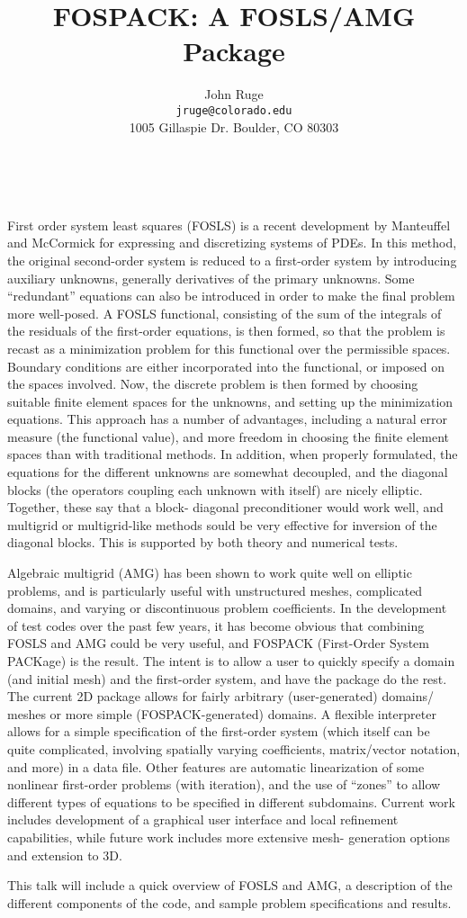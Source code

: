 \documentclass[11pt]{article}
\date{ ~ \hspace{-4mm}}
\title{FOSPACK: A FOSLS/AMG Package  }
\author{John Ruge \\ {\tt  jruge@colorado.edu} \\ 1005 Gillaspie Dr. Boulder, CO  80303}
\begin{document}
\maketitle
\thispagestyle{empty}





 



First order system least squares (FOSLS) is a recent development by Manteuffel 
and McCormick for expressing and discretizing systems of PDEs. In this method,
the original second-order system is reduced to a first-order system by 
introducing auxiliary unknowns, generally derivatives of the primary unknowns.
Some ``redundant'' equations can also be introduced in order to make the final
problem more well-posed. A FOSLS functional, consisting of the sum of the 
integrals of the residuals of the first-order equations, is then formed, so 
that the problem is recast as a minimization problem for this functional over 
the permissible spaces. Boundary conditions are either incorporated into the
functional, or imposed on the spaces involved. Now, the discrete problem is 
then formed by choosing suitable finite element spaces for the unknowns, and 
setting up the minimization equations. This approach has a number of advantages,
including a natural error measure (the functional value), and more freedom in 
choosing the finite element spaces than with traditional methods. In addition, 
when properly formulated, the equations for the different unknowns are 
somewhat decoupled, and the diagonal blocks (the operators coupling each
unknown with itself) are nicely elliptic. Together, these say that a block-
diagonal preconditioner would work well, and multigrid or multigrid-like methods
sould be very effective for inversion of the diagonal blocks. This is
supported by both theory and numerical tests. 

Algebraic multigrid (AMG) has been shown to work quite well on elliptic 
problems, and is particularly useful with unstructured meshes, complicated
domains, and varying or discontinuous problem coefficients. In the development 
of test codes over the past few years, it has become obvious that combining 
FOSLS and AMG could be very useful, and FOSPACK (First-Order System PACKage)
is the result. The intent is to allow a user to quickly specify a domain (and
initial mesh) and the first-order system, and have the package do the rest. 
The current 2D package allows for fairly arbitrary (user-generated) domains/
meshes or more simple (FOSPACK-generated) domains. A flexible interpreter 
allows for a simple specification of the first-order system (which itself can 
be quite complicated, involving spatially varying coefficients, matrix/vector
notation, and more) in a data file. Other features are automatic linearization 
of some nonlinear first-order problems (with iteration), and the use of ``zones'' 
to allow different types of equations to be specified in different subdomains.
Current work includes development of a graphical user interface and local
refinement capabilities, while future work includes more extensive mesh-
generation options and extension to 3D.

This talk will include a quick overview of FOSLS and AMG, a description of the
different components of the code, and sample problem specifications and
results. 
\end{document}

